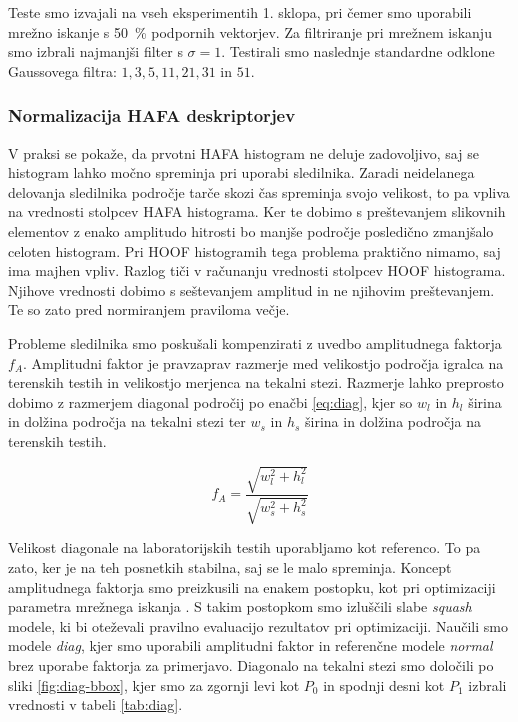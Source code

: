 Teste smo izvajali na vseh eksperimentih 1. sklopa, pri čemer smo uporabili \nurbf mrežno iskanje s \SI{50}{\%} podpornih vektorjev. Za filtriranje pri mrežnem iskanju smo izbrali najmanjši filter s $\sigma = 1$. Testirali smo naslednje standardne odklone Gaussovega filtra: $1, 3, 5, 11, 21, 31$ in $51$. 




\subsubsection{Normalizacija HAFA deskriptorjev}
V praksi se pokaže, da prvotni HAFA histogram ne deluje zadovoljivo, saj se histogram lahko močno spreminja pri uporabi sledilnika. Zaradi neidelanega delovanja sledilnika področje tarče skozi čas spreminja svojo velikost, to pa vpliva na vrednosti stolpcev HAFA histograma. Ker te dobimo s preštevanjem slikovnih elementov z enako amplitudo hitrosti bo manjše področje posledično zmanjšalo celoten histogram. Pri HOOF histogramih tega problema praktično nimamo, saj ima majhen vpliv. Razlog tiči v računanju vrednosti stolpcev HOOF histograma. Njihove vrednosti dobimo s seštevanjem amplitud in ne njihovim preštevanjem. Te so zato pred normiranjem praviloma večje.

Probleme sledilnika smo poskušali kompenzirati z uvedbo amplitudnega faktorja $f_A$. Amplitudni faktor je pravzaprav razmerje med velikostjo področja igralca na terenskih testih in velikostjo merjenca na tekalni stezi. Razmerje lahko preprosto dobimo z razmerjem diagonal področij po enačbi \eqref{eq:diag}, kjer so $w_l$ in $h_l$ širina in dolžina področja na tekalni stezi ter $w_s$ in $h_s$ širina in dolžina področja na terenskih testih.

\begin{equation}
f_A = \frac{\sqrt{w_l^2 + h_l^2}}{\sqrt{w_s^2 + h_s^2}}
\label{eq:diag}
\end{equation}

Velikost diagonale na laboratorijskih testih uporabljamo kot referenco. To pa zato, ker je na teh posnetkih stabilna, saj se le malo spreminja. Koncept amplitudnega faktorja smo preizkusili na enakem postopku, kot pri optimizaciji parametra mrežnega iskanja \nurbf. S takim postopkom smo izluščili slabe \textit{squash} modele, ki bi oteževali pravilno evaluacijo rezultatov pri optimizaciji. Naučili smo modele \textit{diag}, kjer smo uporabili amplitudni faktor in referenčne modele \textit{normal} brez uporabe faktorja za primerjavo. Diagonalo na tekalni stezi smo določili po sliki \ref{fig:diag-bbox}, kjer smo za zgornji levi kot $P_0$ in spodnji desni kot $P_1$ izbrali vrednosti v tabeli \ref{tab:diag}. 


